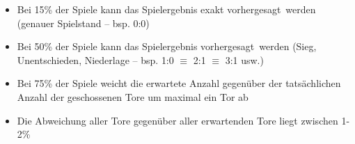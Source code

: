 \begin{itemize}
\item Bei \textsf{15}\% der Spiele kann das Spielergebnis exakt \glqq vorhergesagt\grqq~werden (genauer Spielstand – bsp.  \textsf{0:0})
\item Bei  \textsf{50}\% der Spiele kann das Spielergebnis \glqq vorhergesagt\grqq~werden (Sieg, Unentschieden, Niederlage – bsp.  \textsf{1:0 $\equiv$ 2:1 $\equiv$ 3:1} usw.) 
\item Bei \textsf{75}\% der Spiele weicht die erwartete Anzahl gegenüber der tatsächlichen Anzahl der geschossenen Tore um maximal ein Tor ab
\item Die Abweichung aller Tore gegenüber aller erwartenden Tore liegt zwischen  \textsf{1-2}\%

\end{itemize}
